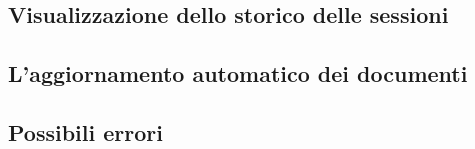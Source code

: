 \subsection{Visualizzazione dello storico delle sessioni}


\subsection{L'aggiornamento automatico dei documenti}


\subsection{Possibili errori}
